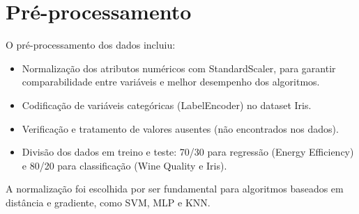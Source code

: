 \section{Pré-processamento}
O pré-processamento dos dados incluiu:
\begin{itemize}
    \item Normalização dos atributos numéricos com StandardScaler, para garantir comparabilidade entre variáveis e melhor desempenho dos algoritmos.
    \item Codificação de variáveis categóricas (LabelEncoder) no dataset Iris.
    \item Verificação e tratamento de valores ausentes (não encontrados nos dados).
    \item Divisão dos dados em treino e teste: 70/30 para regressão (Energy Efficiency) e 80/20 para classificação (Wine Quality e Iris).
\end{itemize}
A normalização foi escolhida por ser fundamental para algoritmos baseados em distância e gradiente, como SVM, MLP e KNN.
